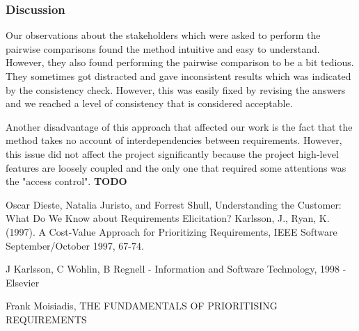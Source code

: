 \subsubsection{Discussion}

Our observations about the stakeholders which were asked to perform the pairwise comparisons found the method intuitive and easy to understand. However, they also found performing the pairwise comparison to be a bit tedious. They sometimes got distracted and gave inconsistent results which was indicated by the consistency check. However, this was easily fixed by revising the answers and we reached a level of consistency that is considered acceptable.

Another disadvantage of this approach that affected our work is the fact that the method takes no account of interdependencies between requirements. However, this issue did not affect the project significantly because the project high-level features are loosely coupled and the only one that required some attentions was the "access control". \textbf{TODO}



\begin{thebibliography}{99}

Oscar Dieste, Natalia Juristo, and Forrest Shull, Understanding the Customer: What Do We Know about Requirements Elicitation?
Karlsson, J., Ryan, K. (1997). A Cost-Value Approach for Prioritizing Requirements, IEEE Software September/October 1997, 67-74.

J Karlsson, C Wohlin, B Regnell - Information and Software Technology, 1998 - Elsevier

Frank Moisiadis, THE FUNDAMENTALS OF PRIORITISING REQUIREMENTS

\end{thebibliography}
